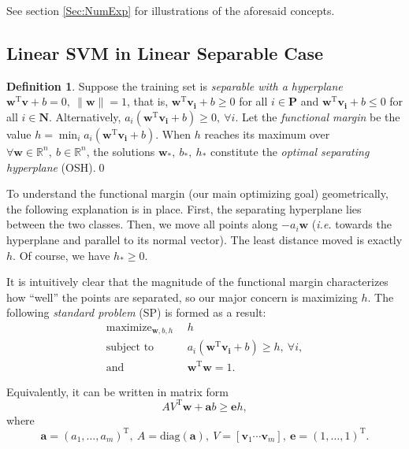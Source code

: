 \documentclass[11pt,a4paper]{article}
\theoremstyle{definition}
\newtheorem{defi}{Definition}
\renewcommand{\vec}[1]{\boldsymbol{#1}}
\begin{document}
    See section \ref{Sec:NumExp} for illustrations of the aforesaid concepts.

    \subsection{\label{Sec:LSVMlsc}Linear SVM in Linear Separable Case}
      \begin{defi}
        Suppose the training set is \textit{separable with a hyperplane} $\vec{w}^{\mathrm{T}}\vec{v}+b=0,~\|\vec{w}\|=1$, that is, $\vec{w}^{\mathrm{T}}\vec{v_{i}}+b\geq 0$ for all $i\in\mathbf{P}$ and $\vec{w}^{\mathrm{T}}\vec{v_{i}}+b\leq 0$ for all $i\in\mathbf{N}$. Alternatively, $a_{i}(\vec{w}^{\mathrm{T}}\vec{v_{i}}+b)\geq 0,~\forall i$. Let the \textit{functional margin} be the value $h=\min_{i}a_{i}(\vec{w}^{\mathrm{T}}\vec{v_{i}}+b)$. When $h$ reaches its maximum over $\forall \vec{w}\in\mathbb{R}^{n},~b\in\mathbb{R}^{n}$, the solutions $\vec{w}_{*},~b_{*},~h_{*}$ constitute the \textit{optimal separating hyperplane} (OSH).\qed
      \end{defi}

      To understand the functional margin (our main optimizing goal) geometrically, the following explanation is in place. First, the separating hyperplane lies between the two classes. Then, we move all points along $-a_{i}\vec{w}$ (\textit{i.e.} towards the hyperplane and parallel to its normal vector). The least distance moved is exactly $h$. Of course, we have $h_{*}\geq 0$.

      It is intuitively clear that the magnitude of the functional margin characterizes how ``well'' the points are separated, so our major concern is maximizing $h$. The following \textit{standard problem} (SP) is formed as a result:
      \begin{align}
        \mathop{\text{maximize}}_{\vec{w},b,h}~~ & h \label{Eqn:SP1}\\
        \text{subject to}~~ & a_{i}(\vec{w}^{\mathrm{T}}\vec{v_{i}}+b)\geq h,~\forall i, \label{Eqn:SP2}\\
        \text{and}~~ & \vec{w}^{\mathrm{T}}\vec{w}=1. \label{Eqn:SP3}
      \end{align}

      Equivalently, it can be written in matrix form \cite{fletcher2010binary}
      \begin{equation}
        AV^{\mathrm{T}}\vec{w}+\vec{a}b\geq\vec{e}h, \label{Eqn:SPmat}
      \end{equation}
      where
      \begin{equation*}
        \vec{a}=(a_{1},\dots,a_{m})^{\mathrm{T}},~A=\text{diag}(\vec{a}),~V=\left[\vec{v}_{1} \cdots \vec{v}_{m}\right],~\vec{e}=(1,\dots,1)^{\mathrm{T}}.
      \end{equation*}
\end{document}
